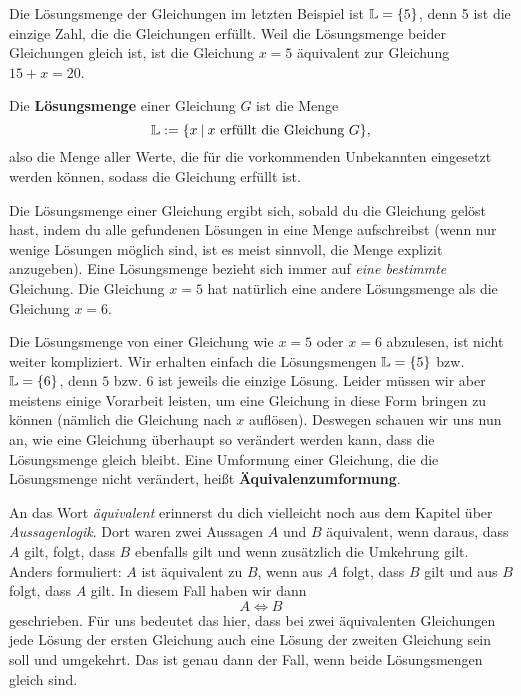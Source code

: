 \documentclass[../../main.tex]{subfiles}
\begin{document}
\begin{example}
    Die Lösungsmenge der Gleichungen im letzten Beispiel ist $\mathbb{L}=\{5\}$, denn 5 ist die einzige Zahl, die die Gleichungen erfüllt. Weil die Lösungsmenge beider Gleichungen gleich ist, ist die Gleichung $x=5$ äquivalent zur Gleichung $15+x=20$.
\end{example}

\begin{definition}[Lösungsmenge]
    Die \textbf{Lösungsmenge} einer Gleichung $G$ ist die Menge 
    \[\mathbb{L}:=\{x\:|\:x~\text{erfüllt die Gleichung~}G\},\]
    also die Menge aller Werte, die für die vorkommenden Unbekannten eingesetzt werden können, sodass die Gleichung erfüllt ist.
\end{definition}

Die Lösungsmenge einer Gleichung ergibt sich, sobald du die Gleichung gelöst hast, indem du alle gefundenen Lösungen in eine Menge aufschreibst (wenn nur wenige Lösungen möglich sind, ist es meist sinnvoll, die Menge explizit anzugeben). Eine Lösungsmenge bezieht sich immer auf \emph{eine bestimmte} Gleichung. Die Gleichung $x=5$ hat natürlich eine andere Lösungsmenge als die Gleichung $x=6$.

Die Lösungsmenge von einer Gleichung wie $x=5$ oder $x=6$ abzulesen, ist nicht weiter kompliziert. Wir erhalten einfach die Lösungsmengen $\mathbb{L}=\{5\}$ bzw. $\mathbb{L}=\{6\}$, denn $5$ bzw. $6$ ist jeweils die einzige Lösung. Leider müssen wir aber meistens einige Vorarbeit leisten, um eine Gleichung in diese Form bringen zu können (nämlich die Gleichung nach $x$ auflösen). Deswegen schauen wir uns nun an, wie eine Gleichung überhaupt so verändert werden kann, dass die Lösungsmenge gleich bleibt. Eine Umformung einer Gleichung, die die Lösungsmenge nicht verändert, heißt \textbf{Äquivalenzumformung}.

An das Wort \emph{äquivalent} erinnerst du dich vielleicht noch aus dem Kapitel über \emph{Aussagenlogik}. Dort waren zwei Aussagen $A$ und $B$ äquivalent, wenn daraus, dass $A$ gilt, folgt, dass $B$ ebenfalls gilt und wenn zusätzlich die Umkehrung gilt. Anders formuliert: $A$ ist äquivalent zu $B$, wenn aus $A$ folgt, dass $B$ gilt und aus $B$ folgt, dass $A$ gilt. In diesem Fall haben wir dann
\[A\Leftrightarrow B\]
geschrieben. Für uns bedeutet das hier, dass bei zwei äquivalenten Gleichungen jede Lösung der ersten Gleichung auch eine Lösung der zweiten Gleichung sein soll und umgekehrt. Das ist genau dann der Fall, wenn beide Lösungsmengen gleich sind.
\end{document}
